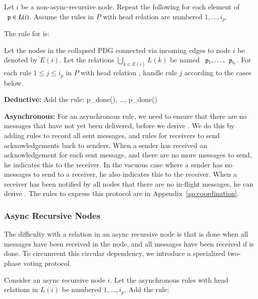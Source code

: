 Let $i$ be a non-async-recursive node.  Repeat the following for each element of $\dedalus{p} \in L(i)$.
Assume the rules in $P$ with head relation
 are numbered $1, \ldots, i_p$.

The rule for 
is: 

Let the nodes in the collapsed PDG connected via incoming edges to node $i$ be denoted by $E(i)$.  Let the relations $\bigcup_{k \in E(i)} L(k)$ be named $\dedalus{p}_1, \ldots, \dedalus{p}_{i_q}$.  For each rule $1 \leq j \leq i_p$ in $P$ with head relation , handle rule $j$ according to the cases below.

\noindent
\textbf{Deductive:}
Add the rule:  
        {p_done(), \ldots, p_done()}

\noindent
\textbf{Asynchronous:}
For an asynchronous rule, we need to ensure that there are no messages that have not yet been delivered, before we derive .  We do this by adding rules to record all sent messages, and rules for receivers to send acknowledgements back to senders.  When a sender has received an acknowledgement for each sent message, and there are no more messages to send, he indicates this to the receiver.  In the vacuous case where a sender has no messages to send to a receiver, he also indicates this to the receiver.  When a receiver has been notified by all nodes that there are no in-flight messages, he can derive .  The rules to express this protocol are in Appendix~\ref{ap:coordination}.

\subsubsection{Async Recursive Nodes}

The difficulty with a relation  in an async recursive node is that  is done when all messages have been received in the node, and all messages have been received if  is done.  To circumvent this circular dependency, we introduce a specialized two-phase voting protocol.

Consider an async recursive node $i$.  Let the asynchronous rules with head relations in $L(i)$ be numbered $1, \ldots, i_p$.  Add the rule: 


